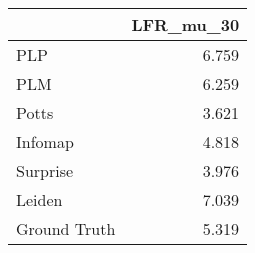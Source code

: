 \begin{tabular}{lr}
\toprule
{} & LFR_mu_30 \\
\midrule
PLP          &     6.759 \\
PLM          &     6.259 \\
Potts        &     3.621 \\
Infomap      &     4.818 \\
Surprise     &     3.976 \\
Leiden       &     7.039 \\
Ground Truth &     5.319 \\
\bottomrule
\end{tabular}
